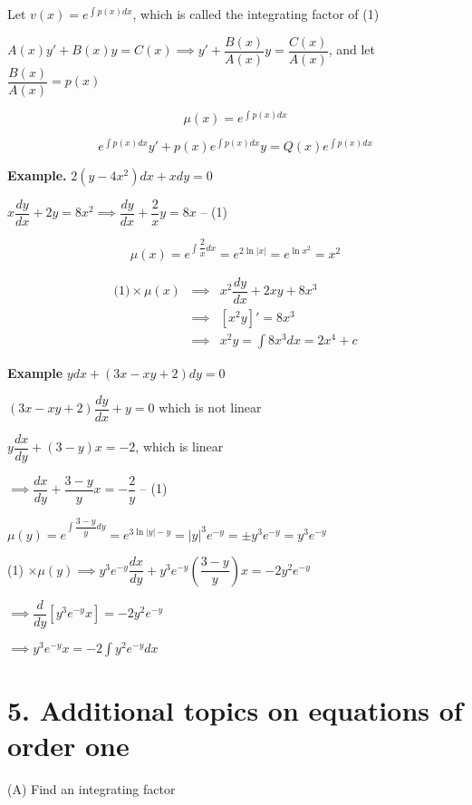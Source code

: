 Let $v(x) = e^{\int p(x)dx}$, which is called the integrating factor of (1)

$A(x)y' + B(x)y = C(x) \implies y' + \dfrac{B(x)}{A(x)}y = \dfrac{C(x)}{A(x)}$, and let $\dfrac{B(x)}{A(x)} = p(x)$

$$\mu(x) = e^{\int p(x)dx}$$

$$e^{\int p(x)dx}y' + p(x)e^{\int p(x)dx}y = Q(x) e^{\int p(x) dx}$$

\textbf{Example.} $2(y - 4x^2)dx + xdy = 0$

\begin{solution}
	$x \dfrac{dy}{dx} + 2y = 8x^2 \implies \dfrac{dy}{dx} + \dfrac{2}{x}y = 8x$ -- (1)
	
	$$\mu(x) = e^{\int \dfrac{2}{x}dx} = e^{2\ln|x|} = e^{\ln x^2} = x^2$$
	
	\begin{eqnarray*}
		\text{(1)} \times \mu(x) &\implies& x^2 \dfrac{dy}{dx} + 2xy + 8x^3\\
		&\implies& [x^2y]' = 8x^3\\
		&\implies& x^2 y = \int 8x^3dx = 2x^4 + c
	\end{eqnarray*} 
\end{solution}

\textbf{Example} $ydx + (3x - xy + 2)dy = 0$

\begin{solution}
	$(3x - xy + 2)\dfrac{dy}{dx} + y = 0$ which is not linear
	
	$y \dfrac{dx}{dy} + (3 - y)x = -2$, which is linear
	
	$\implies \dfrac{dx}{dy} + \dfrac{3 - y}{y}x = -\dfrac{2}{y}$ -- (1)
	
	$\mu(y) = e^{\int \dfrac{3 - y}{y}dy} = e^{3\ln|y| - y} = |y|^3e^{-y} = \pm y^3 e^{-y} = y^3 e^{-y}$
	
	(1) $\times \mu (y) \implies y^3 e^{-y}\dfrac{dx}{dy} + y^3e^{-y}\left(\dfrac{3-y}{y}\right)x = -2y^2e^{-y}$
	
	$\implies \dfrac{d}{dy}\left[y^3e^{-y}x\right] = -2y^2 e^{-y}$
	
	$\implies y^3 e^{-y}x = -2\int y^2e^{-y}dx$
\end{solution}

\section*{5. Additional topics on equations of order one}

(A) Find an integrating factor


